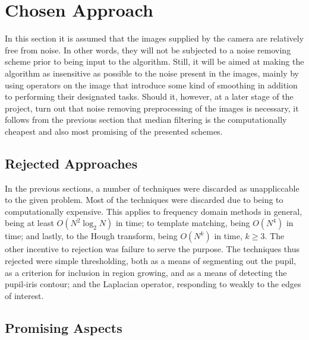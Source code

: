 
\section{Chosen Approach}
\label{eval:approach}

In this section it is assumed that the images supplied by the camera
are relatively free from noise.  In other words, they will not be
subjected to a noise removing scheme prior to being input to the
algorithm.  Still, it will be aimed at making the algorithm as
insensitive as possible to the noise present in the images, mainly by
using operators on the image that introduce some kind of smoothing in
addition to performing their designated tasks.  Should it, however, at
a later stage of the project, turn out that noise removing
preprocessing of the images is necessary, it follows from the previous
section that median filtering is the computationally cheapest and also
most promising of the presented schemes.

\subsection{Rejected Approaches}
\label{eval:approach:reject}

In the previous sections, a number of techniques were discarded as
unappliccable to the given problem.  Most of the techniques were
discarded due to being to computationally expensive.  This applies to
frequency domain methods in general, being at least
$O(N^{2}\log_{2}N)$ in time; to template matching, being $O(N^{4})$ in
time; and lastly, to the Hough transform, being $O(N^{k})$ in time,
$k\geq 3$.  The other incentive to rejection was failure to serve the
purpose.  The techniques thus rejected were simple thresholding, both
as a means of segmenting out the pupil, as a criterion for inclusion
in region growing, and as a means of detecting the pupil-iris contour;
and the Laplacian operator, responding to weakly to the edges of
interest.

\subsection{Promising Aspects}
\label{eval:approach:aspect}

